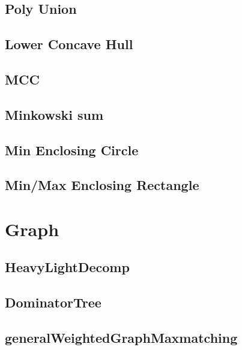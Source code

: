 \documentclass[10pt,twocolumn,oneside]{article}
\begin{document}
\subsection{Poly Union}


\subsection{Lower Concave Hull}


\subsection{MCC}


\subsection{Minkowski sum}


\subsection{Min Enclosing Circle}


\subsection{Min/Max Enclosing Rectangle}


\section{Graph}
\subsection{HeavyLightDecomp}


\subsection{DominatorTree}


\subsection{generalWeightedGraphMaxmatching}

\end{document}
